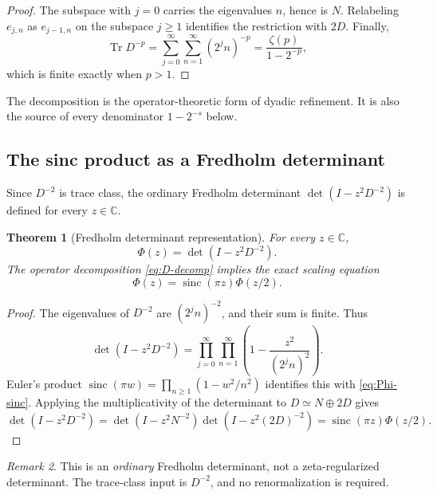 \documentclass[11pt,oneside]{article}
\numberwithin{equation}{section}
\theoremstyle{plain}
\newtheorem{theorem}{Theorem}[section]
\theoremstyle{definition}
\theoremstyle{remark}
\newtheorem{remark}[theorem]{Remark}
\newcommand{\sinc}{\operatorname{sinc}}
\newcommand{\Tr}{\operatorname{Tr}}
\newcommand{\C}{\mathbb C}
\begin{document}
\begin{proof}
The subspace with $j=0$ carries the eigenvalues $n$, hence is $N$.  Relabeling $e_{j,n}$ as $e_{j-1,n}$ on the subspace $j\ge1$ identifies the restriction with $2D$.  Finally,
\[
 \Tr D^{-p}
 =\sum_{j=0}^{\infty}\sum_{n=1}^{\infty}(2^jn)^{-p}
 =\frac{\zeta(p)}{1-2^{-p}},
\]
which is finite exactly when $p>1$.
\end{proof}

The decomposition is the operator-theoretic form of dyadic refinement.  It is also the source of every denominator $1-2^{-s}$ below.

\subsection{The sinc product as a Fredholm determinant}

Since $D^{-2}$ is trace class, the ordinary Fredholm determinant $\det(I-z^2D^{-2})$ is defined for every $z\in\C$.

\begin{theorem}[Fredholm determinant representation]\label{thm:fredholm}
For every $z\in\C$,
\begin{equation}\label{eq:fredholm}
 \boxed{\ \Phi(z)=\det(I-z^2D^{-2}).\ }
\end{equation}
The operator decomposition \cref{eq:D-decomp} implies the exact scaling equation
\begin{equation}\label{eq:scaling-spectral}
 \Phi(z)=\sinc(\pi z)\Phi(z/2).
\end{equation}
\end{theorem}

\begin{proof}
The eigenvalues of $D^{-2}$ are $(2^jn)^{-2}$, and their sum is finite.  Thus
\[
 \det(I-z^2D^{-2})
 =\prod_{j=0}^{\infty}\prod_{n=1}^{\infty}
 \left(1-\frac{z^2}{(2^jn)^2}\right).
\]
Euler's product $\sinc(\pi w)=\prod_{n\ge1}(1-w^2/n^2)$ identifies this with \cref{eq:Phi-sinc}.  Applying the multiplicativity of the determinant to $D\simeq N\oplus2D$ gives
\[
 \det(I-z^2D^{-2})
 =\det(I-z^2N^{-2})
  \det\!\left(I-z^2(2D)^{-2}\right)
 =\sinc(\pi z)\Phi(z/2).
\]
\end{proof}

\begin{remark}
This is an \emph{ordinary} Fredholm determinant, not a zeta-regularized determinant.  The trace-class input is $D^{-2}$, and no renormalization is required.
\end{remark}
\end{document}
